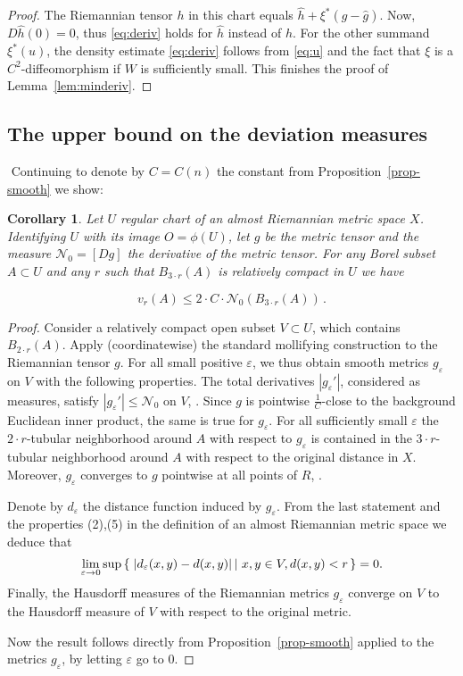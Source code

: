 \documentclass[12pt,leqno,intlimits]{amsart}
\numberwithin{equation}{section}
\newtheorem{cor}[thm]{Corollary}
\theoremstyle{definition}
\theoremstyle{remark}
\newcommand{\pref}[1]{Proposition~\ref{#1}}
\newcommand{\lref}[1]{Lemma~\ref{#1}}
\newcommand*{\set}[2]{\left\{\,\left.{#1}\vphantom{#2}\,\right|\,{#2}\,\right\}}
\begin{document}
\begin{proof}
The Riemannian tensor $h$ in this chart equals $\hat h +\xi^{\ast } (g-\hat g)$.
Now, $D\hat h (0) =0$, thus
\eqref{eq:deriv} holds for $\hat h$ instead of $h$. For the other summand $\xi ^{\ast} (u)$, the density estimate
\eqref{eq:deriv} follows from \eqref{eq:u} and the fact that $\xi$ is a $C^2$-diffeomorphism
if $W$ is sufficiently small. This finishes the proof of \lref{lem:minderiv}.
\end{proof}


\subsection{The upper bound on the deviation measures}
$ $
%
Continuing to denote by $C=C(n)$ the constant from Proposition~\ref{prop-smooth} we show:

\begin{cor} \label{cor-dc-vr}
Let $U$ regular chart of an almost Riemannian metric space $X$. Identifying $U$ with its image $O=\phi (U)$, let
$g$ be the metric tensor and the measure $\mathcal N_0 =[Dg]$ the derivative of the metric tensor. For any Borel subset $A\subset U$ and any $r$
such that $B_{3{\cdot}r} (A)$ is relatively compact in $U$ we have

\[
v_r (A) \leq 2 \cdot C \cdot \mathcal N_0 (B_{3{\cdot}r} (A))\, .
\]
\end{cor}

\begin{proof}
Consider a relatively compact open subset $ V \subset U$, which contains $B_{2{\cdot}r} (A)$. Apply (coordinatewise) the standard mollifying construction
to the Riemannian tensor $g$. For all small positive $\varepsilon$, we thus obtain smooth metrics $g_{\varepsilon}$ on $V$ with the following properties.
The total derivatives $|g_{\varepsilon} '|$, considered as measures, satisfy $|g_{\varepsilon} '|\leq \mathcal N_0$ on $V$, \cite[Theorem 5.3.1]{Ziemer}. Since $g$ is pointwise $\frac 1 C$-close to the background Euclidean inner product, the same is true for $g_{\varepsilon}$. For all sufficiently small $\varepsilon$ the $2{\cdot}r$-tubular neighborhood around $A$ with respect to $g_{\varepsilon}$ is contained in the $3{\cdot}r$-tubular neighborhood around $A$ with respect to the original distance in $X$. Moreover, $g_{\varepsilon}$ converges to $g$ pointwise at all points of $R$, \cite[Theorem 1.6.1]{Ziemer}.

Denote by $d_{\varepsilon}$ the distance function induced by $g_{\varepsilon}$. From the last statement and the properties (2),(5) in the definition of an almost Riemannian metric space we deduce that
\[
\lim _{\varepsilon \to 0} \sup \set{|d_{\varepsilon} (x,y) -d(x,y)|}{x,y \in V, d(x,y) <r}=0  .
\]
Finally, the Hausdorff measures of the Riemannian metrics $g_{\varepsilon}$ converge on $V$ to the Hausdorff measure of $V$ with respect to the original metric.

Now the result follows directly from \pref{prop-smooth} applied to the metrics $g_{\varepsilon}$, by letting $\varepsilon$ go to $0$.
\end{proof}
\end{document}
